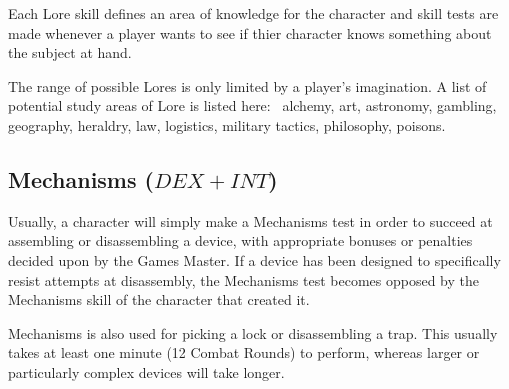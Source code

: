 Each Lore skill defines an area of knowledge for the character and skill tests are made whenever a player wants to see if thier character knows something about the subject at hand. 

The range of possible Lores is only limited by a player’s imagination. A list of potential study areas of Lore is listed here:  alchemy, art, astronomy, gambling, geography, heraldry, law, logistics, military tactics, philosophy, poisons.


\subsection{Mechanisms ($DEX+INT$)}
Usually, a character will simply make a Mechanisms test in order to succeed at assembling or disassembling a device, with appropriate bonuses or penalties decided upon by the Games Master. If a device has been designed to specifically resist attempts at disassembly, the Mechanisms test becomes opposed by the Mechanisms skill of the character that created it. 

Mechanisms is also used for picking a lock or disassembling a trap. This usually takes at least one minute (12 Combat Rounds) to perform, whereas larger or particularly complex devices will take longer.

